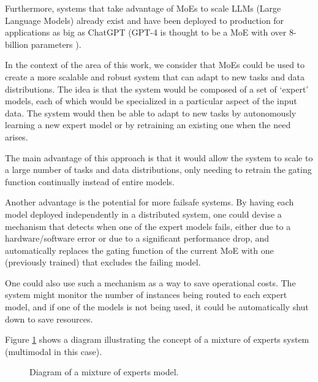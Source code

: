 \documentclass[../main.tex]{subfiles}
\begin{document}
    Furthermore, systems that take advantage of MoEs to scale LLMs (Large Language Models) already exist and have been deployed to production for applications as big as ChatGPT (GPT-4 is thought to be a MoE with over 8-billion parameters ).
    
    In the context of the area of this work, we consider that MoEs could be used to create a more scalable and robust system that can adapt to new tasks and data distributions. The idea is that the system would be composed of a set of `expert' models, each of which would be specialized in a particular aspect of the input data. The system would then be able to adapt to new tasks by autonomously learning a new expert model or by retraining an existing one when the need arises.
    
    The main advantage of this approach is that it would allow the system to scale to a large number of tasks and data distributions, only needing to retrain the gating function continually instead of entire models. 
    
    Another advantage is the potential for more failsafe systems. By having each model deployed independently in a distributed system, one could devise a mechanism that detects when one of the expert models fails, either due to a hardware/software error or due to a significant performance drop, and automatically replaces the gating function of the current MoE with one (previously trained) that excludes the failing model.
    
    One could also use such a mechanism as a way to save operational costs. The system might monitor the number of instances being routed to each expert model, and if one of the models is not being used, it could be automatically shut down to save resources.

    Figure \ref{fig:moes} shows a diagram illustrating the concept of a mixture of experts system (multimodal in this case).

    \begin{figure}[H]
        \centering
        \caption{Diagram of a mixture of experts model.}
        \resizebox*{0.8\linewidth}{!}{
            
        }
        \label{fig:moes}
    \end{figure}

  
\end{document}
